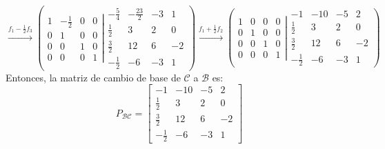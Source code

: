 \documentclass[a4paper,12pt]{article}
\begin{document}
$$
\xrightarrow[]{f_1-\frac{1}{2}f_3}
\left ( \left.\begin{matrix}
    1 & -\frac{1}{2} & 0 & 0 \\ 
    0 & 1 & 0 & 0 \\
    0 & 0 & 1 & 0 \\ 
    0 & 0 & 0 & 1
    \end{matrix}\right| \begin{matrix}
    -\frac{5}{4} & -\frac{23}{2} & -3 & 1 \\ 
    \frac{1}{2} & 3 & 2 & 0 \\
    \frac{3}{2} & 12 & 6 & -2 \\ 
    -\frac{1}{2} & -6 & -3 & 1
    \end{matrix}\right )
\xrightarrow[]{f_1+\frac{1}{2}f_2}
\left ( \left.\begin{matrix}
    1 & 0 & 0 & 0 \\ 
    0 & 1 & 0 & 0 \\
    0 & 0 & 1 & 0 \\ 
    0 & 0 & 0 & 1
    \end{matrix}\right| \begin{matrix}
    -1 & -10 & -5 & 2 \\ 
    \frac{1}{2} & 3 & 2 & 0 \\
    \frac{3}{2} & 12 & 6 & -2 \\ 
    -\frac{1}{2} & -6 & -3 & 1
    \end{matrix}\right )
$$
Entonces, la matriz de cambio de base de $\mathcal{C}$ a $\mathcal{B}$ es:
$$
P_{\mathcal{B} \mathcal{C}} = \begin{bmatrix}
    -1 & -10 & -5 & 2 \\ 
    \frac{1}{2} & 3 & 2 & 0 \\
    \frac{3}{2} & 12 & 6 & -2 \\ 
    -\frac{1}{2} & -6 & -3 & 1
\end{bmatrix}
$$
\end{document}
